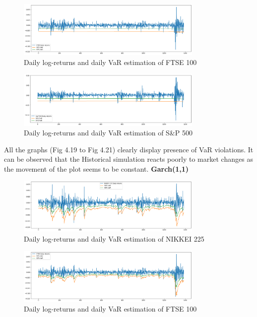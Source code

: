 \documentclass[a4paper,11pt,oneside]{book}
\begin{document}
\begin{figure}[!h]
	\centering
	\includegraphics[width=0.8\textwidth]{figures/HISTF}
	\caption{Daily log-returns and daily VaR estimation of FTSE 100}
	\label{HistF}
\end{figure}

\begin{figure}[!h]
	\centering
	\includegraphics[width=0.8\textwidth]{figures/HISTS}
	\caption{Daily log-returns and daily VaR estimation of S\&P 500}
	\label{HistS}
\end{figure}
All the graphs (Fig 4.19 to Fig 4.21) clearly display presence of VaR violations. It can be observed that the Historical simulation reacts poorly to market changes as the movement of the plot seems to be constant.
\newpage
	\textbf{Garch(1,1)}
\begin{figure}[!h]
	\centering
	\includegraphics[width=0.8\textwidth]{figures/GARCHN}
	\caption{Daily log-returns and daily VaR estimation of NIKKEI 225}
	\label{garchN}
\end{figure}

\begin{figure}[!h]
	\centering
	\includegraphics[width=0.8\textwidth]{figures/GARCHF}
	\caption{Daily log-returns and daily VaR estimation of FTSE 100}
	\label{garchF}
\end{figure}
\end{document}

